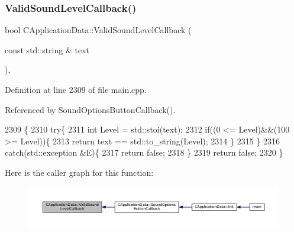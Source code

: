\subsubsection{\texorpdfstring{Valid\+Sound\+Level\+Callback()}{ValidSoundLevelCallback()}}
{\footnotesize\ttfamily bool C\+Application\+Data\+::\+Valid\+Sound\+Level\+Callback (\begin{DoxyParamCaption}\item[{const std\+::string \&}]{text }\end{DoxyParamCaption})\hspace{0.3cm}{\ttfamily [static]}, {\ttfamily [protected]}}



Definition at line 2309 of file main.\+cpp.



Referenced by Sound\+Options\+Button\+Callback().


\begin{DoxyCode}
2309                                                                    \{
2310     \textcolor{keywordflow}{try}\{
2311         \textcolor{keywordtype}{int} Level = std::stoi(text);
2312         \textcolor{keywordflow}{if}((0 <= Level)&&(100 >= Level))\{
2313             \textcolor{keywordflow}{return} text == std::to\_string(Level);
2314         \}
2315     \}
2316     \textcolor{keywordflow}{catch}(std::exception &E)\{
2317         \textcolor{keywordflow}{return} \textcolor{keyword}{false};
2318     \}
2319     \textcolor{keywordflow}{return} \textcolor{keyword}{false};
2320 \}
\end{DoxyCode}
Here is the caller graph for this function\+:\nopagebreak
\begin{figure}[H]
\begin{center}
\leavevmode
\includegraphics[width=350pt]{classCApplicationData_ae3216a4fccd68c9657d7e936b1a6df67_icgraph}
\end{center}
\end{figure}
\hypertarget{classCApplicationData_a2871f1b0855d14ed77db1abd83585d64}{}\label{classCApplicationData_a2871f1b0855d14ed77db1abd83585d64} 
